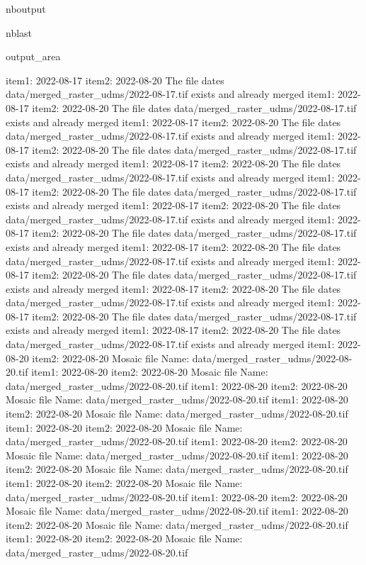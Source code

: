 \documentclass[letterpaper,10pt]{sphinxmanual}
\begin{document}
\begin{sphinxuseclass}{nboutput}
\begin{sphinxuseclass}{nblast}
{\begin{sphinxuseclass}{output_area}
\begin{sphinxuseclass}{}
\begin{sphinxVerbatim}[commandchars=\\\{\}]
item1:  2022-08-17
item2:  2022-08-20
The file dates data/merged\_raster\_udms/2022-08-17.tif exists and already merged
item1:  2022-08-17
item2:  2022-08-20
The file dates data/merged\_raster\_udms/2022-08-17.tif exists and already merged
item1:  2022-08-17
item2:  2022-08-20
The file dates data/merged\_raster\_udms/2022-08-17.tif exists and already merged
item1:  2022-08-17
item2:  2022-08-20
The file dates data/merged\_raster\_udms/2022-08-17.tif exists and already merged
item1:  2022-08-17
item2:  2022-08-20
The file dates data/merged\_raster\_udms/2022-08-17.tif exists and already merged
item1:  2022-08-17
item2:  2022-08-20
The file dates data/merged\_raster\_udms/2022-08-17.tif exists and already merged
item1:  2022-08-17
item2:  2022-08-20
The file dates data/merged\_raster\_udms/2022-08-17.tif exists and already merged
item1:  2022-08-17
item2:  2022-08-20
The file dates data/merged\_raster\_udms/2022-08-17.tif exists and already merged
item1:  2022-08-17
item2:  2022-08-20
The file dates data/merged\_raster\_udms/2022-08-17.tif exists and already merged
item1:  2022-08-17
item2:  2022-08-20
The file dates data/merged\_raster\_udms/2022-08-17.tif exists and already merged
item1:  2022-08-17
item2:  2022-08-20
The file dates data/merged\_raster\_udms/2022-08-17.tif exists and already merged
item1:  2022-08-17
item2:  2022-08-20
The file dates data/merged\_raster\_udms/2022-08-17.tif exists and already merged
item1:  2022-08-17
item2:  2022-08-20
The file dates data/merged\_raster\_udms/2022-08-17.tif exists and already merged
item1:  2022-08-20
item2:  2022-08-20
Mosaic file Name:  data/merged\_raster\_udms/2022-08-20.tif
item1:  2022-08-20
item2:  2022-08-20
Mosaic file Name:  data/merged\_raster\_udms/2022-08-20.tif
item1:  2022-08-20
item2:  2022-08-20
Mosaic file Name:  data/merged\_raster\_udms/2022-08-20.tif
item1:  2022-08-20
item2:  2022-08-20
Mosaic file Name:  data/merged\_raster\_udms/2022-08-20.tif
item1:  2022-08-20
item2:  2022-08-20
Mosaic file Name:  data/merged\_raster\_udms/2022-08-20.tif
item1:  2022-08-20
item2:  2022-08-20
Mosaic file Name:  data/merged\_raster\_udms/2022-08-20.tif
item1:  2022-08-20
item2:  2022-08-20
Mosaic file Name:  data/merged\_raster\_udms/2022-08-20.tif
item1:  2022-08-20
item2:  2022-08-20
Mosaic file Name:  data/merged\_raster\_udms/2022-08-20.tif
item1:  2022-08-20
item2:  2022-08-20
Mosaic file Name:  data/merged\_raster\_udms/2022-08-20.tif
item1:  2022-08-20
item2:  2022-08-20
Mosaic file Name:  data/merged\_raster\_udms/2022-08-20.tif
item1:  2022-08-20
item2:  2022-08-20
Mosaic file Name:  data/merged\_raster\_udms/2022-08-20.tif

\end{sphinxVerbatim}
\end{sphinxuseclass}
\end{sphinxuseclass}}
\end{sphinxuseclass}
\end{sphinxuseclass}
\end{document}
